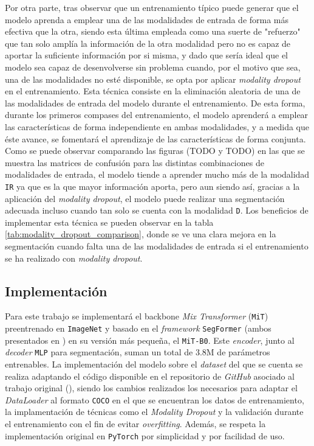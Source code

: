 \documentclass[12pt,a4paper]{report}
\begin{document}
Por otra parte, tras observar que un entrenamiento típico puede generar que el modelo aprenda a emplear una de las modalidades de entrada de forma más efectiva que la otra, siendo esta última empleada como una suerte de "refuerzo" que tan solo amplía la información de la otra modalidad pero no es capaz de aportar la suficiente información por si misma, y dado que sería ideal que el modelo sea capaz de desenvolverse sin problema cuando, por el motivo que sea, una de las modalidades no esté disponible, se opta por aplicar \textit{modality dropout} en el entrenamiento. Esta técnica consiste en la eliminación aleatoria de una de las modalidades de entrada del modelo durante el entrenamiento. De esta forma, durante los primeros compases del entrenamiento, el modelo aprenderá a emplear las características de forma independiente en ambas modalidades, y a medida que éste avance, se fomentará el aprendizaje de las características de forma conjunta. Como se puede observar comparando las figuras (TODO y TODO) en las que se muestra las matrices de confusión para las distintas combinaciones de modalidades de entrada, el modelo tiende a aprender mucho más de la modalidad \texttt{IR} ya que es la que mayor información aporta, pero aun siendo así, gracias a la aplicación del \textit{modality dropout}, el modelo puede realizar una segmentación adecuada incluso cuando tan solo se cuenta con la modalidad \texttt{D}. Los beneficios de implementar esta técnica se pueden observar en la tabla \ref{tab:modality_dropout_comparison}, donde se ve una clara mejora en la segmentación cuando falta una de las modalidades de entrada si el entrenamiento se ha realizado con \textit{modality dropout}.

\subsection{Implementación}
\label{subsec:implementation}
Para este trabajo se implementará el backbone \textit{Mix Transformer} (\texttt{MiT}) preentrenado en \texttt{ImageNet} y basado en el \textit{framework} \texttt{SegFormer} (ambos presentados en \cite{xie2021segformersimpleefficientdesign}) en su versión más pequeña, el \texttt{MiT-B0}. Este \textit{encoder}, junto al \textit{decoder} \texttt{MLP} para segmentación, suman un total de 3.8M de parámetros entrenables. La implementación del modelo sobre el \textit{dataset} del que se cuenta se realiza adaptando el código disponible en el repositorio de \textit{GitHub} asociado al trabajo original (\cite{zhang2023cmxcrossmodalfusionrgbx}), siendo los cambios realizados los necesarios para adaptar el \textit{DataLoader} al formato \texttt{COCO} en el que se encuentran los datos de entrenamiento, la implamentación de técnicas como el \textit{Modality Dropout} y la validación durante el entrenamiento con el fin de evitar \textit{overfitting}. Además, se respeta la implementación original en \texttt{PyTorch} por simplicidad y por facilidad de uso.
\end{document}
